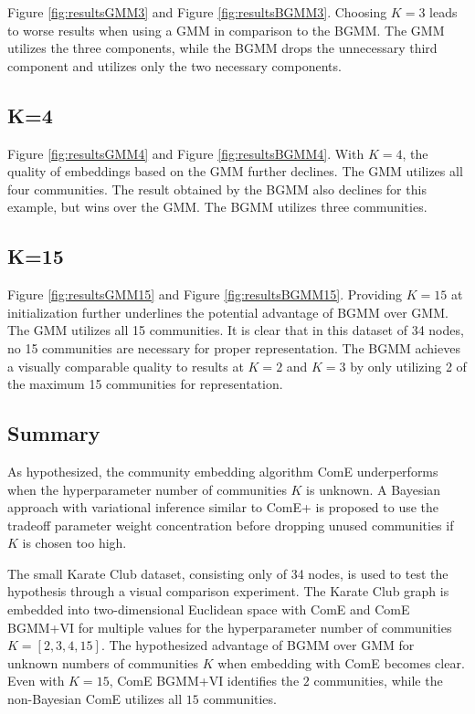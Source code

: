 \documentclass[conference]{IEEEtran}
\begin{document}

Figure \ref{fig:resultsGMM3} and Figure \ref{fig:resultsBGMM3}.
Choosing $K=3$ leads to worse results when using a GMM in comparison to the BGMM. The GMM utilizes the three components, while the BGMM drops the unnecessary third component and utilizes only the two necessary components.

\subsection{K=4}


Figure \ref{fig:resultsGMM4} and Figure \ref{fig:resultsBGMM4}.
With $K=4$, the quality of embeddings based on the GMM further declines. The GMM utilizes all four communities. The result obtained by the BGMM also declines for this example, but wins over the GMM. The BGMM utilizes three communities.

\subsection{K=15}


Figure \ref{fig:resultsGMM15} and Figure \ref{fig:resultsBGMM15}.
Providing $K=15$ at initialization further underlines the potential advantage of BGMM over GMM. The GMM utilizes all 15 communities. It is clear that in this dataset of 34 nodes, no 15 communities are necessary for proper representation. The BGMM achieves a visually comparable quality to results at $K=2$ and $K=3$ by only utilizing 2 of the maximum 15 communities for representation.

\subsection{Summary}

As hypothesized, the community embedding algorithm ComE underperforms when the hyperparameter number of communities $K$ is unknown. A Bayesian approach with variational inference similar to ComE+ is proposed to use the tradeoff parameter weight concentration before dropping unused communities if $K$ is chosen too high.

The small Karate Club dataset, consisting only of 34 nodes, is used to test the hypothesis through a visual comparison experiment. The Karate Club graph is embedded into two-dimensional Euclidean space with ComE and ComE BGMM+VI for multiple values for the hyperparameter number of communities $K = [2, 3, 4, 15]$. The hypothesized advantage of BGMM over GMM for unknown numbers of communities $K$ when embedding with ComE becomes clear. Even with $K=15$, ComE BGMM+VI identifies the $2$ communities, while the non-Bayesian ComE utilizes all $15$ communities.
\end{document}
